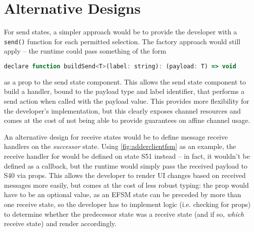 \section{Alternative Designs}

For send states, a simpler approach would be
to provide the developer with a \texttt{send()} function 
for each permitted selection.
The factory approach would still apply -- the runtime could pass something
of the form

\begin{lstlisting}[language=javascript, numbers=none]
declare function buildSend<T>(label: string): (payload: T) => void
\end{lstlisting}

as a prop to the send state component.
This allows the send state component to build a handler,
bound to the payload type and label identifier, that performs a 
send action when called with the payload value.
This provides more flexibility for the developer's implementation,
but this clearly exposes channel resources and 
comes at the cost of not being able to provide guarantees
on affine channel usage.

An alternative design for receive states
would be to define message receive handlers on the
\textit{successor} state.
Using \cref{fig:adderclientfsm} as an example,
the receive handler for 
would be defined on state S51 instead -- in fact, it wouldn't
be defined as a callback, but the runtime would simply pass
the received payload to S40 via props.
This allows the developer to render UI changes
based on received messages more easily, but comes at the
cost of less robust typing:
the  prop would have to be an optional value,
as an EFSM state can be preceded by more than one receive state,
so the developer has to implement logic (i.e. checking
for  props) to determine whether
the predecessor state was a receive state (and if so,
\textit{which} receive state) and render accordingly.